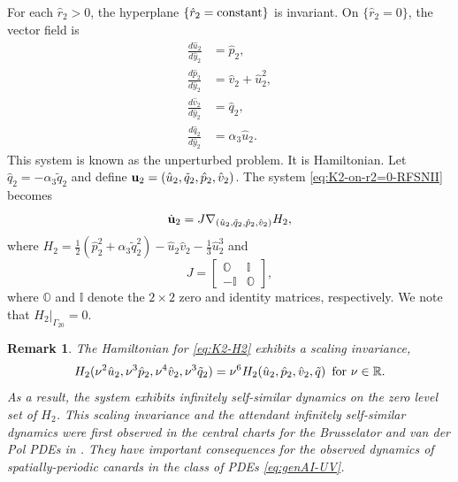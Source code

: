 \documentclass[11pt]{article}
\numberwithin{equation}{section}
\newtheorem{remark}{Remark}[section]
\begin{document}
For each $\hat{r}_2>0$, the hyperplane $\{ \hat{r}_2 = {\rm constant} \}$ is invariant.
On $\{ \hat{r}_2=0 \}$, the vector field is 
\begin{equation} \label{eq:K2-on-r2=0-RFSNII}
\begin{split}
    \frac{d\hat{u}_2}{d\hat{y}_2} &= \hat{p}_2, \\ 
    \frac{d\hat{p}_2}{d\hat{y}_2} &= \hat{v}_2 + \hat{u}_2^2, \\
    \frac{d\hat{v}_2}{d\hat{y}_2} &= \hat{q}_2, \\
    \frac{d\hat{q}_2}{d\hat{y}_2} &= \alpha_3 \hat{u}_2.
\end{split}
\end{equation}
%
This system is known as the unperturbed problem.
It is Hamiltonian.
Let $\hat{q}_2 = - \alpha_3 \tilde{q}_2$ and define
${\bf u}_2 = (\hat{u}_2,\tilde{q}_2,\hat{p}_2,\hat{v}_2)$.
The system \eqref{eq:K2-on-r2=0-RFSNII} becomes
\begin{equation} \label{eq:K2-H2}
\dot{\bf u}_2=J {\bf \nabla}_{(\hat{u}_2,\tilde{q}_2,\hat{p}_2,\hat{v}_2)} H_2, 
\end{equation}
where $H_2=\tfrac{1}{2}(\hat{p}_2^2 + \alpha_3 \tilde{q}_2^2) - \hat{u}_2 \hat{v}_2 - \tfrac{1}{3}\hat{u}_2^3$ and 
%
\[ J = \begin{bmatrix} \mathbb O & \mathbb I \\ -\mathbb I & \mathbb O \end{bmatrix}, \]
%
where $\mathbb O$ and $\mathbb I$ denote the $2 \times 2$ zero and identity matrices, respectively.
We note that $H_2 \vert_{\Gamma_{20}} = 0.$

\begin{remark}
The Hamiltonian for \eqref{eq:K2-H2} exhibits a scaling invariance,
\begin{equation}\label{eq:scalinginvarH2}
    H_2(\nu^2 \hat{u}_2,\nu^3 \hat{p}_2,\nu^4 \hat{v}_2, \nu^3 \tilde{q}_2) = \nu^6 H_2(\hat{u}_2,\hat{p}_2,\hat{v}_2,\tilde{q}) \, \, \, {\rm for} \,\,  \nu \in \mathbb{R}.
\end{equation}
As a result, the system exhibits infinitely self-similar dynamics on the zero level set of $H_2$.
This scaling invariance and the attendant infinitely self-similar dynamics were first observed in the central charts for the Brusselator and van der Pol PDEs in \cite{JDKV2026,VDK2025}.
They have important consequences for the observed dynamics of spatially-periodic canards in the class of PDEs \eqref{eq:genAI-UV}.
\end{remark}
\end{document}
